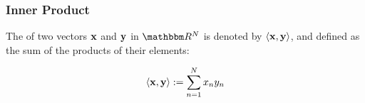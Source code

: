 



\begin{frame}
    \frametitle{Inner Product}
    
     \vspace{2em}
    The  of two vectors ${\mathbf x}$ and ${\mathbf y}$ in $\RR^N$ is
    denoted by $\left\langle{ {\mathbf x} ,   {\mathbf y} }\right\rangle$, and defined
    as the sum of the products of their elements:
    
    \vspace{.7em}
    \begin{equation*}
        \label{eq:dipv}
        \left\langle{ {\mathbf x} ,   {\mathbf y} }\right\rangle := \sum_{n=1}^N x_n y_n 
    \end{equation*}
    
    
\end{frame}







    

